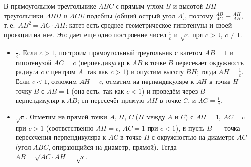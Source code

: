 \begin{remark}
В прямоугольном треугольнике $ABC$ с прямым углом $B$ и высотой $BH$ треугольники $ABH$ и $ACB$ подобны (общий острый
угол $A$), поэтому $\frac{AB}{AC}=\frac{AH}{AB}$, т.\,е.\ $AB^2=AC\cdot AH$: катет есть среднее геометрическое гипотенузы и
своей проекции на неё. Это даёт ещё одно построение чисел $\frac1c$ и $\sqrt c$ при $c>0$, $c\ne1$.
\begin{itemize}[leftmargin=*]
\item $\frac1c$. Если $c>1$, построим прямоугольный треугольник с катетом $AB=1$ и гипотенузой $AC=c$ (перпендикуляр к
$AB$ в точке $B$ пересекает окружность радиуса $c$ с центром $A$, так как $c>1$) и опустим высоту $BH$; тогда
$AH=\frac1c$. Если $c<1$, отложим $AH=c$, отметим на перпендикуляре к $AH$ в точке $H$ точку $B$ с $AB=1$ (она есть,
так как $c<1$) и проведём через $B$ перпендикуляр к $AB$; он пересечёт прямую $AH$ в точке $C$, и $AC=\frac1c$.
\item $\sqrt c$. Отметим на прямой точки $A$, $H$, $C$ ($H$ между $A$ и $C$) с $AH=1$, $AC=c$ при $c>1$ (соответственно
$AH=c$, $AC=1$ при $c<1$), и пусть $B$~--- точка пересечения перпендикуляра к $AC$ в точке $H$ с окружностью на
диаметре $AC$ (угол $ABC$, опирающийся на диаметр, прямой). Тогда $AB=\sqrt{AC\cdot AH}=\sqrt c$.
\end{itemize}
\end{remark}

\begin{center}
\begin{keepfig}
\centering
{}
\end{keepfig}
\end{center}

